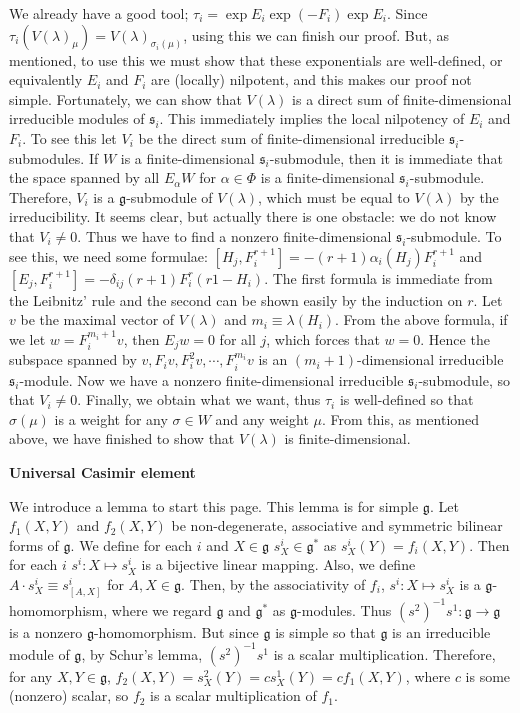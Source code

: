 \documentclass{article}
\newcommand{\lie}[1]{\mathfrak{#1}}
\begin{document}
We already have a good tool; $\tau_i = \exp{E_i} \exp{(-F_i)} \exp{E_i}$.
Since $\tau_i(V(\lambda)_\mu) = V(\lambda)_{\sigma_i(\mu)}$, using this we can finish our proof.
But, as mentioned, to use this we must show that these exponentials are well-defined, or equivalently $E_i$ and $F_i$ are (locally) nilpotent, and this makes our proof not simple.
Fortunately, we can show that $V(\lambda)$ is a direct sum of finite-dimensional irreducible modules of $\lie{s}_i$.
This immediately implies the local nilpotency of $E_i$ and $F_i$.
To see this let $V_i$ be the direct sum of finite-dimensional irreducible $\lie{s}_i$-submodules.
If $W$ is a finite-dimensional $\lie{s}_i$-submodule, then it is immediate that the space spanned by all $E_\alpha W$ for $\alpha \in \Phi$ is a finite-dimensional $\lie{s}_i$-submodule.
Therefore, $V_i$ is a $\lie{g}$-submodule of $V(\lambda)$, which must be equal to $V(\lambda)$ by the irreducibility.
It seems clear, but actually there is one obstacle: we do not know that $V_i \ne 0$.
Thus we have to find a nonzero finite-dimensional $\lie{s}_i$-submodule.
To see this, we need some formulae: $[H_j, F_i^{r + 1}] = -(r + 1) \alpha_i(H_j) F_i^{r + 1}$ and $[E_j, F_i^{r + 1}] = -\delta_{ij} (r + 1) F_i^r (r1 - H_i)$.
The first formula is immediate from the Leibnitz' rule and the second can be shown easily by the induction on $r$.
Let $v$ be the maximal vector of $V(\lambda)$ and $m_i \equiv \lambda(H_i)$.
From the above formula, if we let $w = F_i^{m_i + 1} v$, then $E_j w = 0$ for all $j$, which forces that $w = 0$.
Hence the subspace spanned by $v, F_i v, F_i^2 v, \cdots, F_i^{m_i} v$ is an $(m_i + 1)$-dimensional irreducible $\lie{s}_i$-module.
Now we have a nonzero finite-dimensional irreducible $\lie{s}_i$-submodule, so that $V_i \ne 0$.
Finally, we obtain what we want, thus $\tau_i$ is well-defined so that $\sigma(\mu)$ is a weight for any $\sigma \in W$ and any weight $\mu$.
From this, as mentioned above, we have finished to show that $V(\lambda)$ is finite-dimensional.

\newpage

\textbf{Universal Casimir element}

We introduce a lemma to start this page.
This lemma is for simple $\lie{g}$.
Let $f_1(X, Y)$ and $f_2(X, Y)$ be non-degenerate, associative and symmetric bilinear forms of $\lie{g}$.
We define for each $i$ and $X \in \lie{g}$ $s^i_X \in \lie{g}^*$ as $s^i_X(Y) = f_i(X, Y)$.
Then for each $i$ $s^i : X \mapsto s^i_X$ is a bijective linear mapping.
Also, we define $A \cdot s^i_X \equiv s^i_{[A, X]}$ for $A, X \in \lie{g}$.
Then, by the associativity of $f_i$, $s^i : X \mapsto s^i_X$ is a $\lie{g}$-homomorphism, where we regard $\lie{g}$ and $\lie{g}^*$ as $\lie{g}$-modules.
Thus $(s^2)^{-1} s^1 : \lie{g} \to \lie{g}$ is a nonzero $\lie{g}$-homomorphism.
But since $\lie{g}$ is simple so that $\lie{g}$ is an irreducible module of $\lie{g}$, by Schur's lemma, $(s^2)^{-1} s^1$ is a scalar multiplication.
Therefore, for any $X, Y \in \lie{g}$, $f_2(X, Y) = s^2_X(Y) = c s^1_X(Y) = cf_1(X, Y)$, where $c$ is some (nonzero) scalar, so $f_2$ is a scalar multiplication of $f_1$.
\end{document}
